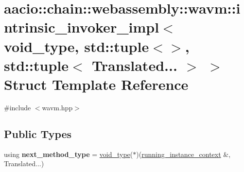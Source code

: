 \hypertarget{structaacio_1_1chain_1_1webassembly_1_1wavm_1_1intrinsic__invoker__impl_3_01void__type_00_01std_ca4856f3e4c245f4294d33861b24210b}{}\section{aacio\+:\+:chain\+:\+:webassembly\+:\+:wavm\+:\+:intrinsic\+\_\+invoker\+\_\+impl$<$ void\+\_\+type, std\+:\+:tuple$<$$>$, std\+:\+:tuple$<$ Translated... $>$ $>$ Struct Template Reference}
\label{structaacio_1_1chain_1_1webassembly_1_1wavm_1_1intrinsic__invoker__impl_3_01void__type_00_01std_ca4856f3e4c245f4294d33861b24210b}


{\ttfamily \#include $<$wavm.\+hpp$>$}

\subsection*{Public Types}
\begin{DoxyCompactItemize}
\item 
\mbox{\label{structaacio_1_1chain_1_1webassembly_1_1wavm_1_1intrinsic__invoker__impl_3_01void__type_00_01std_ca4856f3e4c245f4294d33861b24210b_a6d38e0ad8430990b71012858995ca7c5}} 
using {\bfseries next\+\_\+method\+\_\+type} = \mbox{\hyperlink{structaacio_1_1chain_1_1webassembly_1_1wavm_1_1void__type}{void\+\_\+type}}($\ast$)(\mbox{\hyperlink{structaacio_1_1chain_1_1webassembly_1_1wavm_1_1running__instance__context}{running\+\_\+instance\+\_\+context}} \&, Translated...)
\end{DoxyCompactItemize}

